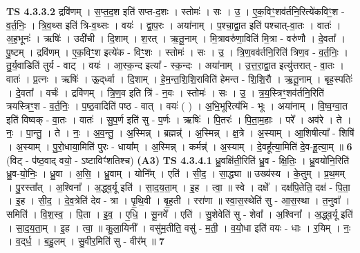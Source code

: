 \documentclass[17pt]{extarticle}
\begin{document}
                  \newline
                                \textbf{ TS 4.3.3.2} \newline
                  द्रवि॑णम् । स॒प्त॒द॒श इति॑ सप्त-द॒शः । स्तोमः॑ । सः । उ॒ । ए॒क॒विꣳ॒॒शव॑र्तनि॒रित्ये॑कविꣳ॒॒श - व॒र्त॒निः॒ । त्रि॒व॒थ्स इति॑ त्रि-व॒थ्सः । वयः॑ । द्वा॒प॒रः । अया॑नाम् । प॒श्चा॒द्वा॒त इति॑ पश्चात्-वा॒तः । वातः॑ । अ॒ह॒भूनः॑ । ऋषिः॑ । उदी॑ची । दि॒शाम् । श॒रत् । ऋ॒तू॒नाम् । मि॒त्रावरु॑णा॒विति॑ मि॒त्रा - वरु॑णौ । दे॒वता᳚ । पु॒ष्टम् । द्रवि॑णम् । ए॒क॒विꣳ॒॒श इत्ये॑क - विꣳ॒॒शः । स्तोमः॑ । सः । उ॒ । त्रि॒ण॒वव॑र्तनि॒रिति॑ त्रिण॒व - व॒र्त॒निः॒ । तु॒र्य॒वाडिति॑ तुर्य - वाट् । वयः॑ । आ॒स्क॒न्द इत्या᳚ - स्क॒न्दः । अया॑नाम् । उ॒त्त॒रा॒द्वा॒त इत्यु॑त्तरात् - वा॒तः । वातः॑ । प्र॒त्नः । ऋषिः॑ । ऊ॒द्‌र्ध्वा । दि॒शाम् । हे॒म॒न्त॒शि॒शि॒राविति॑ हेमन्त - शि॒शि॒रौ । ऋ॒तू॒नाम् । बृह॒स्पतिः॑ । दे॒वता᳚ । वर्चः॑ । द्रवि॑णम् । त्रि॒ण॒व इति त्रि॑ - न॒वः । स्तोमः॑ । सः । उ॒ । त्र॒य॒स्त्रिꣳ॒॒शव॑र्तनि॒रिति॑ त्रयस्त्रिꣳ॒॒श - व॒र्त॒निः॒ । प॒ष्ठ॒वादिति॑ पष्ठ - वात् । वयः॑ ( ) । अ॒भि॒भूरित्य॑भि - भूः । अया॑नाम् । वि॒ष्व॒ग्वा॒त इति॑ विष्वक् - वा॒तः । वातः॑ । सु॒प॒र्ण इति॑ सु - प॒र्णः । ऋषिः॑ । पि॒तरः॑ । पि॒ता॒म॒हाः । परे᳚ । अव॑रे । ते । नः॒ । पा॒न्तु॒ । ते । नः॒ । अ॒व॒न्तु॒ । अ॒स्मिन्न् । ब्रह्मन्न्॑ । अ॒स्मिन्न् । क्ष॒त्रे । अ॒स्याम् । आ॒शिषीत्या᳚ - शिषि॑ । अ॒स्याम् । पु॒रो॒धाया॒मिति॑ पुरः - धाया᳚म् । अ॒स्मिन्न् । कर्मन्न्॑ । अ॒स्याम् । दे॒वहू᳚त्या॒मिति॑ दे॒व-हू॒त्या॒म् ॥ \textbf{  6} \newline
                  \newline
                      (विट् - प॑ष्ठ॒वाद् वयो॒ - ऽष्टाविꣳ॑शतिश्च)  \textbf{(A3)} \newline \newline
                                \textbf{ TS 4.3.4.1} \newline
                  ध्रु॒वक्षि॑ती॒रिति॑ ध्रु॒व - क्षि॒तिः॒ । ध्रु॒वयो॑नि॒रिति॑ ध्रु॒व-यो॒निः॒ । ध्रु॒वा । अ॒सि॒ । ध्रु॒वाम् । योनि᳚म् । एति॑ । सी॒द॒ । सा॒द्ध्या ॥ उख्य॑स्य । के॒तुम् । प्र॒थ॒मम् । पु॒रस्ता᳚त् । अ॒श्विना᳚ । अ॒द्ध्व॒र्यू इति॑ । सा॒द॒य॒ता॒म् । इ॒ह । त्वा॒ ॥ स्वे । दक्षे᳚ । दक्ष॑पि॒तेति॒ दक्ष॑ - पि॒ता॒ । इ॒ह । सी॒द॒ । दे॒व॒त्रेति॑ देव - त्रा । पृ॒थि॒वी । बृ॒ह॒ती । ररा॑णा ॥ स्वा॒स॒स्थेति॑ सु - आ॒स॒स्था । त॒नुवा᳚ । समिति॑ । वि॒श॒स्व॒ । पि॒ता । इ॒व॒ । ए॒धि॒ । सू॒नवे᳚ । एति॑ । सु॒शेवेति॑ सु - शेवा᳚ । अ॒श्विना᳚ । अ॒द्ध्व॒र्यू इति॑ । सा॒द॒य॒ता॒म् । इ॒ह । त्वा॒ ॥ कु॒ला॒यिनी᳚ । वसु॑म॒तीति॒ वसु॑ - म॒ती॒ । व॒यो॒धा इति॑ वयः - धाः । र॒यिम् । नः॒ । व॒द्‌र्ध॒ । ब॒हु॒लम् । सु॒वीर॒मिति॑ सु - वीर᳚म् ॥ \textbf{  7 } \newline
\end{document}
